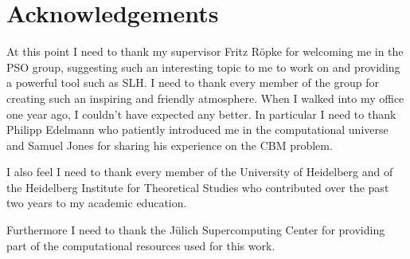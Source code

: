 \chapter*{Acknowledgements}
\thispagestyle{empty}
At this point I need to thank my supervisor Fritz Röpke for welcoming me in the PSO group, suggesting such an interesting topic to me to work on and providing a powerful tool such as SLH. I need to thank every member of the group for creating such an inspiring and friendly atmosphere. When I walked into my office one year ago, I couldn't have expected any better. In particular I need to thank Philipp Edelmann who patiently introduced me in the computational universe and Samuel Jones for sharing his experience on the CBM problem.

I also feel I need to thank every member of the University of Heidelberg and of the Heidelberg Institute for Theoretical Studies who contributed over the past two years to my academic education.

Furthermore I need to thank the Jülich Supercomputing Center for providing part of the computational resources used for this work.

